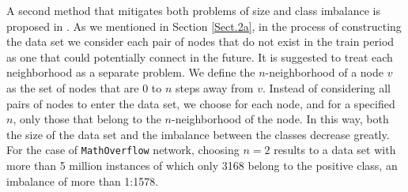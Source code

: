 \documentclass{acm_proc_article-sp}
\begin{document}

A second method that mitigates both problems of size and class imbalance is proposed in \cite{Lichtenwalter:2010:NPM:1835804.1835837}. As we mentioned in Section \ref{Sect.2a}, in the process of constructing the data set we consider each pair of nodes that do not exist in the train period as one that could potentially connect in the future. It is suggested to treat each neighborhood as a separate problem. We define the $n$-neighborhood of a node $v$ as the set of nodes that are 0 to $n$ steps away from $v$. Instead of considering all pairs of nodes to enter the data set, we choose for each node, and for a specified $n$, only those that belong to the $n$-neighborhood of the node. In this way, both the size of the data set and the imbalance between the classes decrease greatly. For the case of \texttt{MathOverflow} network, choosing $n=2$ results to a data set with more than 5 million instances of which only 3168 belong to the positive class, an imbalance of more than 1:1578.





\end{document}

